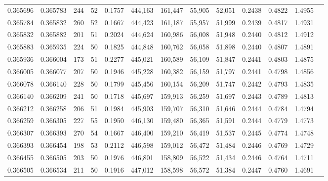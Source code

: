 \begin{tabular}{rrrrrrrrrrrrr}
0.365696 & 0.365783 &   244 &  52 &                                     0.1757 & 444,163 & 161,447 &  55,905 &  52,051 & 0.2438 & 0.4822 & 1.4955 \\
0.365784 & 0.365832 &   260 &  52 &                                     0.1667 & 444,423 & 161,187 &  55,957 &  51,999 & 0.2439 & 0.4817 & 1.4931 \\
0.365832 & 0.365882 &   201 &  51 &                                     0.2024 & 444,624 & 160,986 &  56,008 &  51,948 & 0.2440 & 0.4812 & 1.4912 \\
0.365883 & 0.365935 &   224 &  50 &                                     0.1825 & 444,848 & 160,762 &  56,058 &  51,898 & 0.2440 & 0.4807 & 1.4891 \\
0.365936 & 0.366004 &   173 &  51 &                                     0.2277 & 445,021 & 160,589 &  56,109 &  51,847 & 0.2441 & 0.4803 & 1.4875 \\
0.366005 & 0.366077 &   207 &  50 &                                     0.1946 & 445,228 & 160,382 &  56,159 &  51,797 & 0.2441 & 0.4798 & 1.4856 \\
0.366078 & 0.366140 &   228 &  50 &                                     0.1799 & 445,456 & 160,154 &  56,209 &  51,747 & 0.2442 & 0.4793 & 1.4835 \\
0.366140 & 0.366209 &   241 &  50 &                                     0.1718 & 445,697 & 159,913 &  56,259 &  51,697 & 0.2443 & 0.4789 & 1.4813 \\
0.366212 & 0.366258 &   206 &  51 &                                     0.1984 & 445,903 & 159,707 &  56,310 &  51,646 & 0.2444 & 0.4784 & 1.4794 \\
0.366259 & 0.366305 &   227 &  55 &                                     0.1950 & 446,130 & 159,480 &  56,365 &  51,591 & 0.2444 & 0.4779 & 1.4773 \\
0.366307 & 0.366393 &   270 &  54 &                                     0.1667 & 446,400 & 159,210 &  56,419 &  51,537 & 0.2445 & 0.4774 & 1.4748 \\
0.366393 & 0.366454 &   198 &  53 &                                     0.2112 & 446,598 & 159,012 &  56,472 &  51,484 & 0.2446 & 0.4769 & 1.4729 \\
0.366455 & 0.366505 &   203 &  50 &                                     0.1976 & 446,801 & 158,809 &  56,522 &  51,434 & 0.2446 & 0.4764 & 1.4711 \\
0.366505 & 0.366534 &   211 &  50 &                                     0.1916 & 447,012 & 158,598 &  56,572 &  51,384 & 0.2447 & 0.4760 & 1.4691 \\

\end{tabular}
